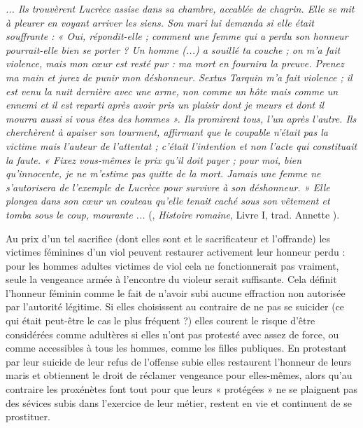  \textsl{... Ils trouvèrent Lucrèce assise dans sa chambre, accablée de chagrin. Elle se mit à pleurer en voyant arriver les siens. Son mari lui demanda si elle était souffrante : « Oui, répondit-elle ; comment une femme qui a perdu son honneur pourrait-elle bien se porter ? Un homme (...) a souillé ta couche ; on m'a fait violence, mais mon cœur est resté pur : ma mort en fournira la preuve. Prenez ma main et jurez de punir mon déshonneur. Sextus Tarquin m'a fait violence ; il est venu la nuit dernière avec une arme, non comme un hôte mais comme un ennemi et il est reparti après avoir pris un plaisir dont je meurs et dont il mourra aussi si vous êtes des hommes ». Ils promirent tous, l'un après l'autre. Ils cherchèrent à apaiser son tourment, affirmant que le coupable n'était pas la victime mais l'auteur de l'attentat ; c'était l'intention et non l'acte qui constituait la faute. « Fixez vous-mêmes le prix qu'il doit payer ; pour moi, bien qu'innocente, je ne m'estime pas quitte de la mort. Jamais une femme ne s'autorisera de l'exemple de Lucrèce pour survivre à son déshonneur. » Elle plongea dans son cœur un couteau qu'elle tenait caché sous son vêtement et tomba sous le coup, mourante ...} (, \emph{Histoire romaine}, Livre I, trad. Annette ).

 Au prix d'un tel sacrifice (dont elles sont et le sacrificateur et l'offrande) les victimes féminines d'un viol peuvent restaurer activement leur honneur perdu : pour les hommes adultes victimes de viol cela ne fonctionnerait pas vraiment, seule la vengeance armée à l'encontre du violeur serait suffisante. Cela définit l'honneur féminin comme le fait de n'avoir subi aucune effraction non autorisée par l'autorité légitime. Si elles choisissent au contraire de ne pas se suicider (ce qui était peut-être le cas le plus fréquent ?) elles courent le risque d'être considérées comme adultères si elles n'ont pas protesté avec assez de force, ou comme accessibles à tous les hommes, comme les filles publiques. En protestant par leur suicide de leur refus de l'offense subie elles restaurent l'honneur de leurs maris et obtiennent le droit de réclamer vengeance pour elles-mêmes, alors qu'au contraire les proxénètes font tout pour que leurs « protégées » ne se plaignent pas des sévices subis dans l'exercice de leur métier, restent en vie et continuent de se prostituer.


